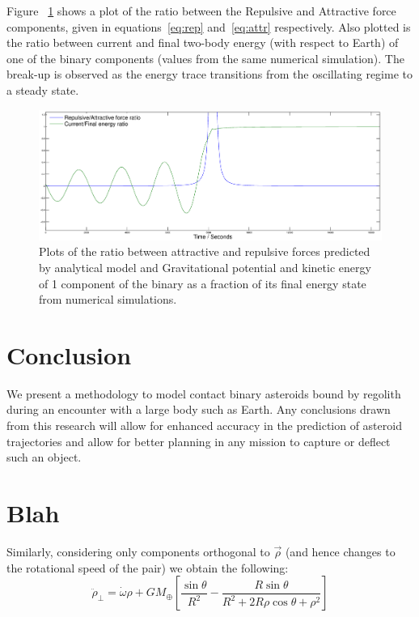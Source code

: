 \documentclass[letterpaper, preprint, paper,11pt]{AAS}	%
\begin{document}
Figure ~\ref{fig:Analy} shows a plot of the ratio between the Repulsive and Attractive force components, given in equations~\ref{eq:rep} and~\ref{eq:attr} respectively. Also plotted is the ratio between current and final two-body energy (with respect to Earth) of one of the binary components (values from the same numerical simulation). The break-up is observed as the energy trace transitions from the oscillating regime to a steady state.
\begin{figure}[H]
\centering
\includegraphics[width=\textwidth]{binary_analy.eps} 
\caption{Plots of the ratio between attractive and repulsive forces predicted by analytical model and Gravitational potential and kinetic energy of 1 component of the binary as a fraction of its final energy state from numerical simulations.} 
\label{fig:Analy}
\end{figure} 




\section{Conclusion}
We present a methodology to model contact binary asteroids bound by regolith during an encounter with a large body such as Earth. Any conclusions drawn from this research will allow for enhanced accuracy in the prediction of asteroid trajectories and allow for better planning in any mission to capture or deflect such an object.


\section{Blah}
Similarly, considering only components orthogonal to $\vec{\rho}$ (and hence changes to the rotational speed of the pair) we obtain the following:
\begin{equation}
\ddot{\rho}_\bot = \dot{\omega}\rho +  {GM_\oplus}\left[\frac{\sin\theta}{R^{2}}-\frac{R\sin\theta}{R^{2}+2R\rho\cos\theta+\rho^{2}}\right]
\end{equation}
\end{document}
